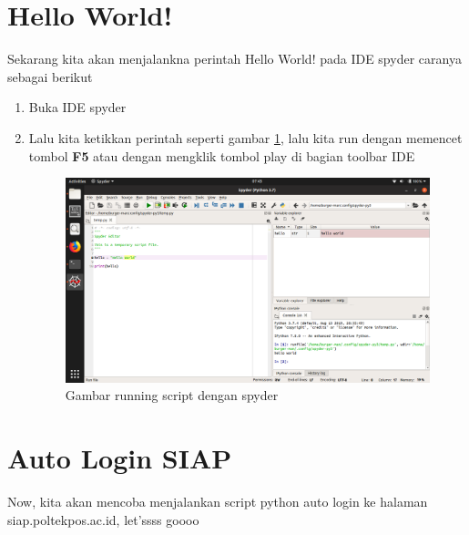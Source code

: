 \section{Hello World!}
Sekarang kita akan menjalankna perintah Hello World! pada IDE spyder caranya sebagai berikut
\begin{enumerate}
\item Buka IDE spyder
\item Lalu kita ketikkan perintah seperti gambar \ref{helloworld}, lalu kita run dengan memencet tombol \textbf{F5} atau dengan mengklik tombol play di bagian toolbar IDE
\begin{figure}[H]
\centering
\includegraphics[width=1\textwidth]{figures/helloworld.png}
\caption{Gambar running script dengan spyder}
\label{helloworld}
\end{figure}
\end{enumerate}

\section{Auto Login SIAP}
Now, kita akan mencoba menjalankan script python auto login ke halaman siap.poltekpos.ac.id, let'ssss goooo

